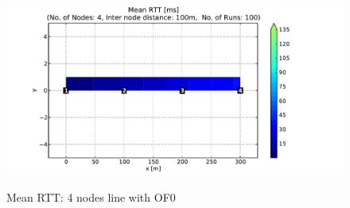 \begin{figure}[htbp]
{      \includegraphics[scale=0.23]{Pics/results/4/OF0/line/dist100_montecarlo_contour.pdf}}
  \caption{Mean RTT: 4 nodes line with OF0}
 \label{fig:rtt_4_line_of0}
\end{figure}

